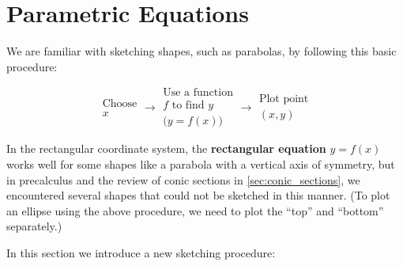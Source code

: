 \section{Parametric Equations}\label{sec:param_eqs}

We are familiar with sketching  shapes, such as parabolas, by following this basic procedure:

\[
\begin{gathered}\text{Choose}\\x\end{gathered}
\longrightarrow
\begin{gathered}
\text{Use a function}\\f\text{ to find }y\\\big(y=f(x)\big)
\end{gathered}
\longrightarrow
\begin{gathered}\text{Plot point}\\(x,y)\end{gathered}
\]

In the rectangular coordinate system, the \textbf{rectangular equation} $y=f(x)$ works well for some shapes like a para\-bola with a vertical axis of symmetry, but in precalculus and the review of conic sections in \autoref{sec:conic_sections}, we encountered several shapes that could not be sketched in this manner. (To plot an ellipse using the above procedure, we need to plot the ``top'' and ``bottom'' separately.)

In this section we introduce a new sketching procedure:

